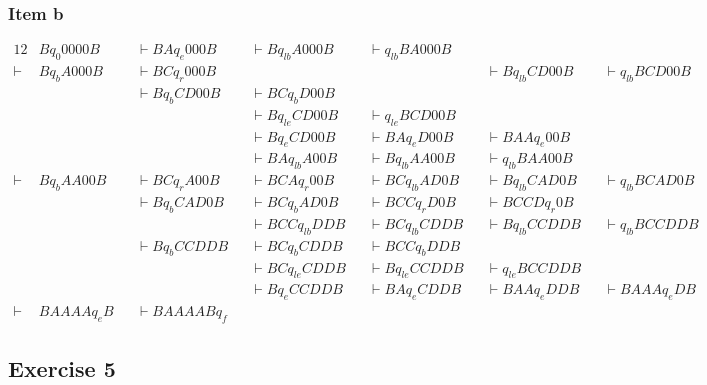 \documentclass[docid=TP11]{tcom_TP}
\begin{document}
{\subsubsection{Item b}
\begin{alignat*}{12}
	       & B q_0 0000B &&\vdash BA q_e 000B &&\vdash B q_{lb} A000B &&\vdash q_{lb} BA000B  && \\
	\vdash & B q_b A000B &&\vdash BC q_r 000B &&                      &&                      &&\vdash B q_{lb} CD00B &&\vdash q_{lb} BCD00B   && \\
		   &             &&\vdash B q_b CD00B &&\vdash BC q_b D00B    &&\\
		   &             &&                   &&\vdash B q_{le} CD00B &&\vdash q_{le} BCD00B  &&\\
		   &             &&                   &&\vdash B q_e CD00B    &&\vdash BA q_e D00B    &&\vdash BAA q_e 00B    &&\\
		   &             &&                   &&\vdash BA q_{lb} A 00B &&\vdash B q_{lb} AA00B &&\vdash q_{lb} BAA00B && \\
	\vdash & B q_b AA00B &&\vdash BC q_r A00B &&\vdash BCA q_r 00B    &&\vdash BC q_{lb} AD0B &&\vdash B q_{lb} CAD0B &&\vdash q_{lb} BCAD0B   &&\\  
		   &             &&\vdash B q_b CAD0B &&\vdash BC q_b AD0B    &&\vdash BCC q_r D0B    &&\vdash BCCD q_r 0B    &&\\
		   &             &&                   &&\vdash BCC q_{lb} DDB &&\vdash BC q_{lb} CDDB &&\vdash B q_{lb} CCDDB &&\vdash  q_{lb} BCCDDB &&\\
		   &             &&\vdash B q_b CCDDB &&\vdash BC q_b CDDB    &&\vdash BCC q_b DDB    &&\\
		   &             &&                   &&\vdash BC q_{le} CDDB &&\vdash B q_{le} CCDDB &&\vdash q_{le} BCCDDB  &&\\
		   &             &&                   &&\vdash B q_e CCDDB    &&\vdash BA q_e CDDB    &&\vdash BAA q_e DDB    &&\vdash BAAA q_e DB    &&\\
	\vdash & BAAAA q_e B &&\vdash BAAAAB q_f 
\end{alignat*}
\subsection{Exercise 5}
}
\end{document}
